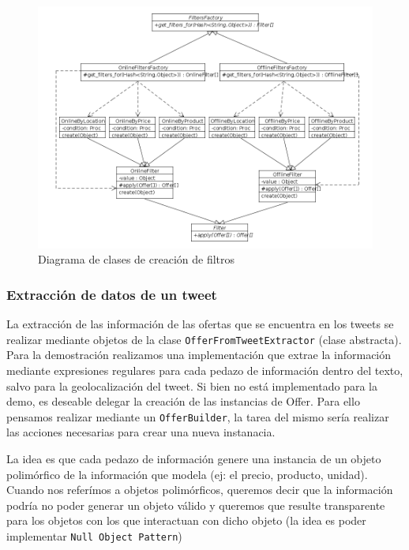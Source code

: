 \begin{figure}[h]
\centerline{\includegraphics[width=\textwidth]{./imgs/class_diagram_filters_factory.png}}
\caption{Diagrama de clases de creación de filtros}
\label{fig:class_filter_factory} 
\end{figure}

\subsubsection{Extracción de datos de un tweet}
La extracción de las información de las ofertas que se encuentra en los tweets se realizar mediante objetos de la clase \texttt{OfferFromTweetExtractor} (clase abstracta).
Para la demostración realizamos una implementación que extrae la información mediante expresiones regulares para cada pedazo de información dentro del texto, salvo para la geolocalización del tweet.
Si bien no está implementado para la demo, es deseable delegar la creación de las instancias de Offer. Para ello pensamos realizar mediante un \texttt{OfferBuilder}, la tarea del mismo sería realizar las acciones necesarias para crear una nueva instanacia.

La idea es que cada pedazo de información genere una instancia de un objeto polimórfico de la información que modela (ej: el precio, producto, unidad).
Cuando nos referímos a objetos polimórficos, queremos decir que la información podría no poder generar un objeto válido y queremos que resulte transparente para los objetos con los que interactuan con dicho objeto (la idea es poder implementar \texttt{Null Object Pattern})

